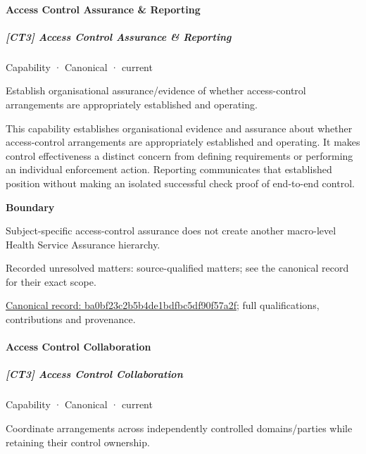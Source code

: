 \paragraph{Access Control Assurance \& Reporting}

\subparagraph{[CT3] Access Control Assurance \& Reporting}

\label{element:ba0bf23c2b5b4de1bdfbc5df90f57a2f}
{\small Capability · Canonical · current}\par

Establish organisational assurance/evidence of whether access-control arrangements are appropriately established and operating.



This capability establishes organisational evidence and assurance about whether access-control arrangements are appropriately established and operating. It makes control effectiveness a distinct concern from defining requirements or performing an individual enforcement action. Reporting communicates that established position without making an isolated successful check proof of end-to-end control.



\textbf{Boundary}



Subject-specific access-control assurance does not create another macro-level Health Service Assurance hierarchy.


{\small Recorded unresolved matters: source-qualified matters; see the canonical record for their exact scope.}\par
{\footnotesize \href{../../../../continuum/strategy/capability/ba0bf23c2b5b4de1bdfbc5df90f57a2f.md}{Canonical record: ba0bf23c2b5b4de1bdfbc5df90f57a2f}; full qualifications, contributions and provenance.}\par
\paragraph{Access Control Collaboration}

\subparagraph{[CT3] Access Control Collaboration}

\label{element:c1a39b83d27a4a148f997c0a709e82ac}
{\small Capability · Canonical · current}\par

Coordinate arrangements across independently controlled domains/parties while retaining their control ownership.



